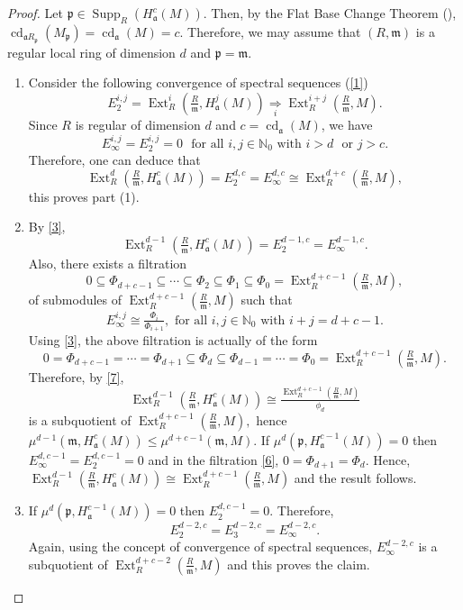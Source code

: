 \documentclass[12pt,twoside, final]{amsart}
\numberwithin{equation}{section}
\newtheorem{nota rem}[thm]{Notation and Remark}
\newtheorem{defen rem}[thm]{Definition and Remark}
\def\Ext{\operatorname{Ext}}
\def\cd{\operatorname{cd}}
\def\Supp{\operatorname{Supp}}
\newcommand{\p}{\mathfrak{p}}
\newcommand{\fa}{\mathfrak{a}}
\newcommand{\m}{\mathfrak{m}}
\newcommand{\NN}{\mathbb{N}}
\begin{document}
\begin{proof}
Let $\p\in \Supp_R(H^c_{\fa}(M))$. Then, by the Flat Base Change Theorem (\cite[Theorem 4. 3. 2]{bsh}), $\cd_{\fa R_{\p}}(M_{\p})= \cd_{\fa}(M)= c$. Therefore, we may assume  that $(R, \m)$ is a regular local ring of dimension $d$ and $\p= \m$. 
    \begin{enumerate}
        \item Consider the following convergence of spectral sequences (\ref{1})
         \[E_2^{i, j}= \Ext^i_{R }(\tfrac{R}{\m}, H^j_{\fa}(M))\underset{i}{\Rightarrow}\Ext^{i+ j}_{R}(\tfrac{R}{\m}, M). \] 
      Since $R$ is regular of dimension $d$ and $c= \cd_{\fa}(M)$, we have
\begin{equation}\label{3}
  E_{\infty}^{i, j}= E_2^{i, j}= 0\,\,\text{ for all}\,\,i, j \in \NN_0\,\, \text{with}\,\,i> d\,\,\text{ or}\,\,j> c. 
\end{equation}
 Therefore, one can deduce that 
 \[\Ext^d_{R }(\tfrac{R}{\m}, H^c_{\fa}(M))= E_2^{d, c}= E_{\infty}^{d, c}\cong \Ext^{d+ c}_{R}(\tfrac{R}{\m}, M),\]
 this proves part (1).
 \item By \ref{3}, 
 \begin{equation}\label{7}
     \Ext^{d- 1}_{R }(\tfrac{R}{\m}, H^c_{\fa}(M))= E_{2}^{d- 1, c}= E_{\infty}^{d- 1, c}.
 \end{equation}
 Also, there exists a filtration 
 \begin{equation}\label{f2}
     0\subseteq \Phi_{d+ c- 1} \subseteq\cdots\subseteq \Phi_{   2} \subseteq\Phi_{   1} \subseteq\Phi_{0}= \Ext^{d+ c- 1}_{R}(\tfrac{R}{\m}, M),
 \end{equation}
 of submodules of $\Ext^{d+ c- 1}_{R}(\tfrac{R}{\m}, M)$ such that 
 \begin{equation*}
     E_{\infty}^{i, j}\cong \tfrac{\Phi_{i}}{\Phi_{i+ 1}},\,\,\text{for all}\,\,i, j\in \NN_0\,\,\text{with}\,\,i+ j= d+ c- 1.
 \end{equation*}
 Using \ref{3}, the above filtration is actually of the form
 \begin{equation} \label{6}
     0= \Phi_{d+ c- 1} =\cdots= \Phi_{   d+ 1} \subseteq\Phi_{  d} \subseteq\Phi_{d- 1} =\cdots= \Phi_{0}= \Ext^{d+ c- 1}_{R}(\tfrac{R}{\m}, M).
 \end{equation}
 Therefore, by \ref{7}, 
 \[\Ext^{d- 1}_{R }(\tfrac{R}{\m}, H^c_{\fa}(M))\cong \tfrac{\Ext^{d+ c- 1}_{R}(\tfrac{R}{\m}, M)}{\phi_{d }}\]
 is a subquotient of 
 $\Ext^{d+ c- 1}_{R}(\tfrac{R}{\m}, M),$ hence $\mu^{d- 1}(\m, H^c_{\fa}(M))\leq  \mu^{d+ c- 1}(\m, M)$.
 If $\mu^d(\p, H^{c- 1}_{\fa}(M))= 0$ then $E_{\infty}^{d, c- 1}= E_2^{d, c- 1}= 0$ and in the filtration 
\ref{6}, $0= \Phi_{   d+ 1}= \Phi_{  d}$. Hence, $\Ext^{d- 1}_{R }(\tfrac{R}{\m}, H^c_{\fa}(M))\cong \Ext^{d+ c- 1}_{R}(\tfrac{R}{\m}, M)$ and the result follows. 
 \item If $\mu^d(\p, H^{c- 1}_{\fa}(M))= 0$ then $E_{2}^{d, c- 1}= 0$. Therefore, 
 \[E_{2}^{d- 2, c }= E_{3}^{d- 2, c }= E_{\infty}^{d- 2, c }.\]
 Again,   using the concept of convergence of spectral sequences, $E_{\infty}^{d- 2, c}$ is a subquotient of $\Ext^{d+ c- 2}_{R}(\tfrac{R}{\m}, M)$ and this proves the claim.
 \end{enumerate}
 \end{proof}
\end{document}
